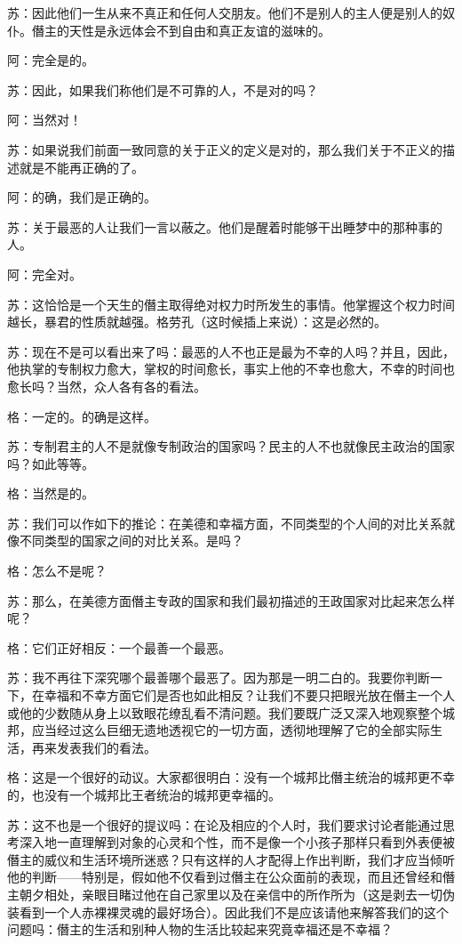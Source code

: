\documentclass[12pt,oneside]{book}
\begin{document}
苏：因此他们一生从来不真正和任何人交朋友。他们不是别人的主人便是别人的奴仆。僭主的天性是永远体会不到自由和真正友谊的滋味的。

阿：完全是的。

苏：因此，如果我们称他们是不可靠的人，不是对的吗？

阿：当然对！

苏：如果说我们前面一致同意的关于正义的定义是对的，那么我们关于不正义的描述就是不能再正确的了。

阿：的确，我们是正确的。

苏：关于最恶的人让我们一言以蔽之。他们是醒着时能够干出睡梦中的那种事的人。

阿：完全对。

苏：这恰恰是一个天生的僭主取得绝对权力时所发生的事情。他掌握这个权力时间越长，暴君的性质就越强。格劳孔（这时候插上来说）：这是必然的。

苏：现在不是可以看出来了吗：最恶的人不也正是最为不幸的人吗？并且，因此，他执掌的专制权力愈大，掌权的时间愈长，事实上他的不幸也愈大，不幸的时间也愈长吗？当然，众人各有各的看法。

格：一定的。的确是这样。

苏：专制君主的人不是就像专制政治的国家吗？民主的人不也就像民主政治的国家吗？如此等等。

格：当然是的。

苏：我们可以作如下的推论：在美德和幸福方面，不同类型的个人间的对比关系就像不同类型的国家之间的对比关系。是吗？

格：怎么不是呢？

苏：那么，在美德方面僭主专政的国家和我们最初描述的王政国家对比起来怎么样呢？

格：它们正好相反：一个最善一个最恶。

苏：我不再往下深究哪个最善哪个最恶了。因为那是一明二白的。我要你判断一下，在幸福和不幸方面它们是否也如此相反？让我们不要只把眼光放在僭主一个人或他的少数随从身上以致眼花缭乱看不清问题。我们要既广泛又深入地观察整个城邦，应当经过这么巨细无遗地透视它的一切方面，透彻地理解了它的全部实际生活，再来发表我们的看法。

格：这是一个很好的动议。大家都很明白：没有一个城邦比僭主统治的城邦更不幸的，也没有一个城邦比王者统治的城邦更幸福的。

苏：这不也是一个很好的提议吗：在论及相应的个人时，我们要求讨论者能通过思考深入地一直理解到对象的心灵和个性，而不是像一个小孩子那样只看到外表便被僭主的威仪和生活环境所迷惑？只有这样的人才配得上作出判断，我们才应当倾听他的判断——特别是，假如他不仅看到过僭主在公众面前的表现，而且还曾经和僭主朝夕相处，亲眼目睹过他在自己家里以及在亲信中的所作所为（这是剥去一切伪装看到一个人赤裸裸灵魂的最好场合）。因此我们不是应该请他来解答我们的这个问题吗：僭主的生活和别种人物的生活比较起来究竟幸福还是不幸福？
\end{document}
